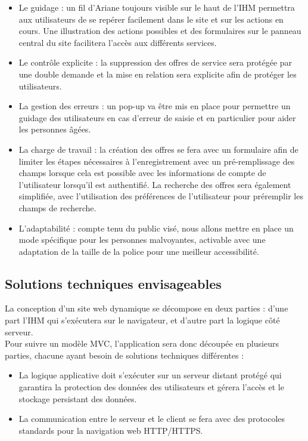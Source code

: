 \documentclass[a4paper,11pt]{article}
\begin{document}
\begin{itemize}
  \item Le guidage : un fil d’Ariane toujours visible sur le haut de l’IHM permettra aux utilisateurs de
  se repérer facilement dans le site et sur les actions en cours. Une illustration des actions
  possibles et des formulaires sur le panneau central du site facilitera l’accès aux différents
  services.
  \item Le contrôle explicite : la suppression des offres de service sera protégée par une double
  demande et la mise en relation sera explicite afin de protéger les utilisateurs.
  \item La gestion des erreurs : un pop-up va être mis en place pour permettre un guidage des
  utilisateurs en cas d’erreur de saisie et en particulier pour aider les personnes âgées.
  \item La charge de travail : la création des offres se fera avec un formulaire afin de limiter les étapes
  nécessaires à l’enregistrement avec un pré-remplissage des champs lorsque cela est possible
  avec les informations de compte de l’utilisateur lorsqu’il est authentifié. La recherche des
  offres sera également simplifiée, avec l’utilisation des préférences de l’utilisateur pour
  préremplir les champs de recherche.
  \item L’adaptabilité : compte tenu du public visé, nous allons mettre en place un mode spécifique
  pour les personnes malvoyantes, activable avec une adaptation de la taille de la police pour
  une meilleur accessibilité.
\end{itemize}

\subsection{Solutions techniques envisageables}

La conception d’un site web dynamique se décompose en deux parties : d’une part l’IHM qui
s’exécutera sur le navigateur, et d’autre part la logique côté serveur.\\

Pour suivre un modèle MVC, l’application sera donc découpée en plusieurs parties, chacune ayant
besoin de solutions techniques différentes :\\

\begin{itemize}
  \item La logique applicative doit s’exécuter sur un serveur distant protégé qui garantira la protection
  des données des utilisateurs et gérera l’accès et le stockage persistant des données.
  \item La communication entre le serveur et le client se fera avec des protocoles standards pour la
  navigation web HTTP/HTTPS.
\end{itemize}
\end{document}
